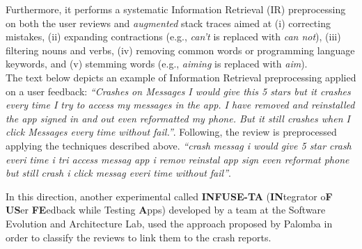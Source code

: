 Furthermore, it performs a systematic Information Retrieval (IR) preprocessing \cite{BaezaYates:1999} on both the user reviews and \textit{augmented} stack traces aimed at (i) correcting mistakes, (ii) expanding contractions (e.g., \textit{can’t} is replaced with \textit{can not}), (iii) filtering nouns and verbs, (iv) removing common words or programming language keywords, and (v) stemming words (e.g., \textit{aiming} is replaced with \textit{aim}). \\
The text below depicts an example of Information Retrieval preprocessing applied on a user feedback: 
\smallbreak
\emph{\small``Crashes on Messages I would give this 5 stars but it crashes every time I try to access my messages in the app. I have removed and reinstalled the app  signed in and out  even reformatted my phone. But it still crashes when I click Messages  every time without fail.''}. 
\smallbreak
Following, the review is preprocessed applying the techniques described above.  
\smallbreak
\emph{\small``crash messag i would give 5 star crash everi time i tri access messag app i remov reinstal app  sign  even reformat phone but still crash i click messag  everi time without fail''}. 
\smallbreak

In this direction, another experimental called \textbf{INFUSE-TA} (\textbf{IN}tegrator o\textbf{F} \textbf{US}er \textbf{FE}edback while Testing \textbf{A}pps) developed by a team at the Software Evolution and Architecture Lab, used the approach proposed by Palomba \etal in order to classify the reviews to link them to the crash reports. 

